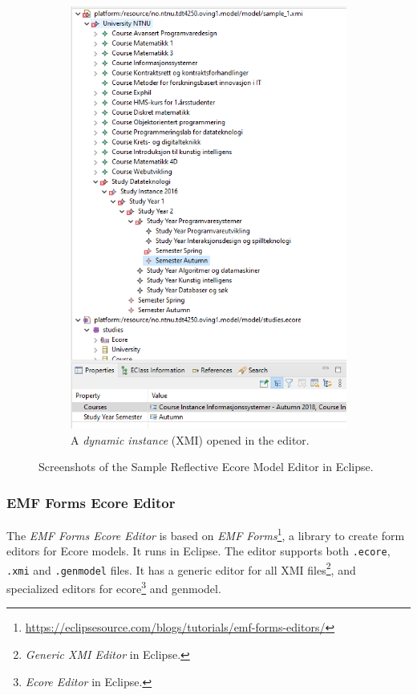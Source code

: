 \begin{figure}
\begin{subfigure}[b]{.45\textwidth}
        \includegraphics[width=\textwidth]{figures/ecore-sample-reflective-ecore-model-editor-instance.png}
        \caption{A \emph{dynamic instance} (\gls{XMI}) opened in the editor.}
        \label{sfig:sample-reflective-ecore-model-instance-screenshot}
    \end{subfigure}
    \caption{Screenshots of the Sample Reflective Ecore Model Editor in \gls{Eclipse}.}\label{fig:sample-reflective-ecore-model}
\end{figure}


\subsubsection{EMF Forms Ecore Editor} %
The \emph{EMF Forms Ecore Editor} is based on \emph{EMF Forms}\footnote{\href{https://eclipsesource.com/blogs/tutorials/emf-forms-editors/}{https://eclipsesource.com/blogs/tutorials/emf-forms-editors/}}, a library to create form editors for \gls{Ecore} models.
It runs in \gls{Eclipse}.
The editor supports both \texttt{.ecore}, \texttt{.xmi} and \texttt{.genmodel} files.
It has a generic editor for all \gls{XMI} files\footnote{\emph{Generic XMI Editor} in \gls{Eclipse}.}, and specialized editors for ecore\footnote{\emph{Ecore Editor} in \gls{Eclipse}.} and genmodel.~\cite{eclipsesourceEMFFormsEditors2016}

